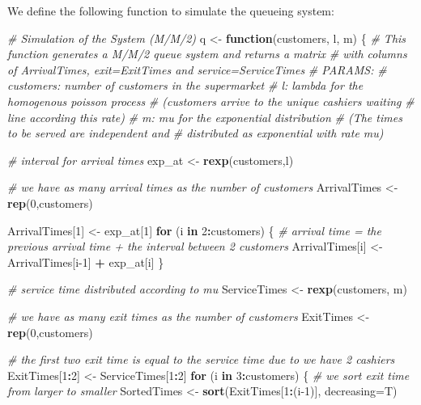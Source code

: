 \documentclass[]{article}
\newenvironment{Shaded}{\begin{snugshade}}{\end{snugshade}}
\newcommand{\CommentTok}[1]{\textcolor[rgb]{0.56,0.35,0.01}{\textit{#1}}}
\newcommand{\ControlFlowTok}[1]{\textcolor[rgb]{0.13,0.29,0.53}{\textbf{#1}}}
\newcommand{\DataTypeTok}[1]{\textcolor[rgb]{0.13,0.29,0.53}{#1}}
\newcommand{\DecValTok}[1]{\textcolor[rgb]{0.00,0.00,0.81}{#1}}
\newcommand{\KeywordTok}[1]{\textcolor[rgb]{0.13,0.29,0.53}{\textbf{#1}}}
\newcommand{\NormalTok}[1]{#1}
\newcommand{\OperatorTok}[1]{\textcolor[rgb]{0.81,0.36,0.00}{\textbf{#1}}}
\newcommand{\StringTok}[1]{\textcolor[rgb]{0.31,0.60,0.02}{#1}}
\begin{document}
We define the following function to simulate the queueing system:

\begin{Shaded}
\begin{Highlighting}[]
\CommentTok{# Simulation of the System (M/M/2)}
\NormalTok{q <-}\StringTok{ }\ControlFlowTok{function}\NormalTok{(customers, l, m) \{}
  \CommentTok{# This function generates a M/M/2 queue system and returns a matrix }
  \CommentTok{# with columns of ArrivalTimes, exit=ExitTimes and service=ServiceTimes}
  \CommentTok{# PARAMS:}
  \CommentTok{# customers:   number of customers in the supermarket}
  \CommentTok{# l:     lambda for the homogenous poisson process }
  \CommentTok{#    (customers arrive to the unique cashiers waiting}
  \CommentTok{#    line according this rate)}
  \CommentTok{# m:     mu for the exponential distribution}
  \CommentTok{#    (The times to be served are independent and }
  \CommentTok{#    distributed as exponential with rate mu)}

  \CommentTok{# interval for arrival times}
\NormalTok{  exp_at <-}\StringTok{ }\KeywordTok{rexp}\NormalTok{(customers,l)}
  
  \CommentTok{# we have as many arrival times as the number of customers}
\NormalTok{  ArrivalTimes <-}\StringTok{ }\KeywordTok{rep}\NormalTok{(}\DecValTok{0}\NormalTok{,customers) }

\NormalTok{  ArrivalTimes[}\DecValTok{1}\NormalTok{] <-}\StringTok{ }\NormalTok{exp_at[}\DecValTok{1}\NormalTok{]}
  \ControlFlowTok{for}\NormalTok{ (i }\ControlFlowTok{in} \DecValTok{2}\OperatorTok{:}\NormalTok{customers) \{}
    \CommentTok{# arrival time = the previous arrival time + the interval between 2 customers}
\NormalTok{    ArrivalTimes[i] <-}\StringTok{ }\NormalTok{ArrivalTimes[i}\DecValTok{-1}\NormalTok{] }\OperatorTok{+}\StringTok{ }\NormalTok{exp_at[i]}
\NormalTok{  \} }
  
  \CommentTok{# service time distributed according to mu}
\NormalTok{  ServiceTimes <-}\StringTok{ }\KeywordTok{rexp}\NormalTok{(customers, m)}
  
  \CommentTok{# we have as many exit times as the number of customers}
\NormalTok{  ExitTimes <-}\StringTok{ }\KeywordTok{rep}\NormalTok{(}\DecValTok{0}\NormalTok{,customers)}
  
  \CommentTok{# the first two exit time is equal to the service time due to we have 2 cashiers}
\NormalTok{  ExitTimes[}\DecValTok{1}\OperatorTok{:}\DecValTok{2}\NormalTok{] <-}\StringTok{ }\NormalTok{ServiceTimes[}\DecValTok{1}\OperatorTok{:}\DecValTok{2}\NormalTok{]}
  \ControlFlowTok{for}\NormalTok{ (i }\ControlFlowTok{in} \DecValTok{3}\OperatorTok{:}\NormalTok{customers) \{}
    \CommentTok{# we sort exit time from larger to smaller}
\NormalTok{    SortedTimes <-}\StringTok{ }\KeywordTok{sort}\NormalTok{(ExitTimes[}\DecValTok{1}\OperatorTok{:}\NormalTok{(i}\DecValTok{-1}\NormalTok{)], }\DataTypeTok{decreasing=}\NormalTok{T)}
    

\end{Highlighting}
\end{Shaded}
\end{document}

